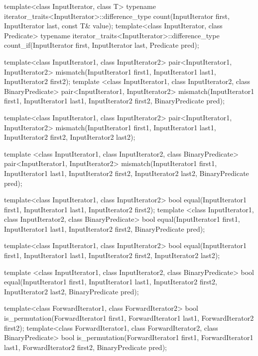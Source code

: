 \begin{codeblock}
{  template<class InputIterator, class T>
    typename iterator_traits<InputIterator>::difference_type
      count(InputIterator first, InputIterator last, const T& value);
  template<class InputIterator, class Predicate>
    typename iterator_traits<InputIterator>::difference_type
      count_if(InputIterator first, InputIterator last, Predicate pred);

  template<class InputIterator1, class InputIterator2>
    pair<InputIterator1, InputIterator2>
      mismatch(InputIterator1 first1, InputIterator1 last1,
               InputIterator2 first2);
  template
   <class InputIterator1, class InputIterator2, class BinaryPredicate>
    pair<InputIterator1, InputIterator2>
      mismatch(InputIterator1 first1, InputIterator1 last1,
               InputIterator2 first2, BinaryPredicate pred);

  template<class InputIterator1, class InputIterator2>
    pair<InputIterator1, InputIterator2>
      mismatch(InputIterator1 first1, InputIterator1 last1,
               InputIterator2 first2, InputIterator2 last2);

  template
   <class InputIterator1, class InputIterator2, class BinaryPredicate>
    pair<InputIterator1, InputIterator2>
      mismatch(InputIterator1 first1, InputIterator1 last1,
               InputIterator2 first2, InputIterator2 last2,
               BinaryPredicate pred);

  template<class InputIterator1, class InputIterator2>
    bool equal(InputIterator1 first1, InputIterator1 last1,
               InputIterator2 first2);
  template
   <class InputIterator1, class InputIterator2, class BinaryPredicate>
    bool equal(InputIterator1 first1, InputIterator1 last1,
               InputIterator2 first2, BinaryPredicate pred);

  template<class InputIterator1, class InputIterator2>
    bool equal(InputIterator1 first1, InputIterator1 last1,
               InputIterator2 first2, InputIterator2 last2);

  template
   <class InputIterator1, class InputIterator2, class BinaryPredicate>
    bool equal(InputIterator1 first1, InputIterator1 last1,
               InputIterator2 first2, InputIterator2 last2,
               BinaryPredicate pred);

  template<class ForwardIterator1, class ForwardIterator2>
    bool is_permutation(ForwardIterator1 first1, ForwardIterator1 last1,
                        ForwardIterator2 first2);
  template<class ForwardIterator1, class ForwardIterator2,
                   class BinaryPredicate>
    bool is_permutation(ForwardIterator1 first1, ForwardIterator1 last1,
                        ForwardIterator2 first2, BinaryPredicate pred);

}
\end{codeblock}
